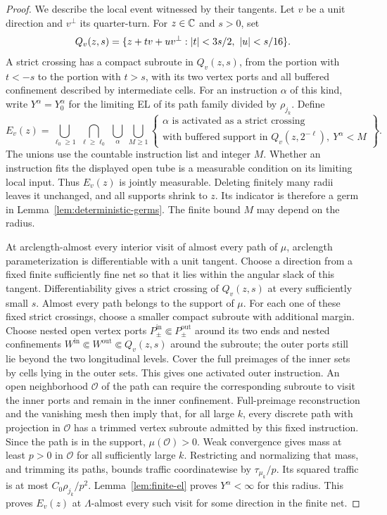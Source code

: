 \begin{proof}
We describe the local event witnessed by their tangents.  Let \(v\) be a
unit direction and \(v^\perp\) its quarter-turn.  For \(z\in\mathbb C\) and
\(s>0\), set
\[
 Q_v(z,s)=
 \{z+tv+uv^\perp:\lvert t\rvert<3s/2,\ \lvert u\rvert<s/16\}.
\]
A strict crossing has a compact subroute in \(Q_v(z,s)\), from the portion
with \(t<-s\) to the portion with \(t>s\), with its two vertex ports and
all buffered confinement described by intermediate cells.  For an
instruction \(\alpha\) of this kind, write \(Y^\alpha=Y_0^\alpha\) for
the limiting EL of its path family divided by \(\rho_{j_k}\).  Define
\begin{equation}\label{eq:crossing-germ}
 E_v(z)=
 \bigcup_{\ell_0\ge1}\ \bigcap_{\ell\ge\ell_0}\
 \bigcup_{\alpha}\ \bigcup_{M\ge1}
 \left\{
 \begin{array}{l}
 \alpha\text{ is activated as a strict crossing}\\[-2pt]
 \text{with buffered support in }Q_v(z,2^{-\ell}),\
 Y^\alpha<M
 \end{array}\right\}.
\end{equation}
The unions use the countable instruction list and integer \(M\).  Whether
an instruction fits the displayed open tube is a measurable condition
on its limiting local input.  Thus \(E_v(z)\) is jointly measurable.
Deleting finitely many radii leaves it unchanged, and all supports shrink
to \(z\).  Its indicator is therefore a germ in
Lemma~\ref{lem:deterministic-germs}.  The finite bound \(M\) may depend on
the radius.

At arclength-almost every interior visit of almost every path of \(\mu\),
arclength parameterization is differentiable with a unit tangent.  Choose
a direction from a fixed finite sufficiently fine net so that it lies
within the angular slack of this tangent.  Differentiability gives a
strict crossing of \(Q_v(z,s)\) at every sufficiently small \(s\).
Almost every path belongs to the support of \(\mu\).  For each one of
these fixed strict crossings, choose a smaller compact subroute with
additional margin.  Choose nested open vertex ports
\(P_\pm^{\mathrm{in}}\Subset P_\pm^{\mathrm{out}}\) around its two ends
and nested confinements
\(W^{\mathrm{in}}\Subset W^{\mathrm{out}}\Subset Q_v(z,s)\) around the
subroute; the outer ports still lie beyond the two longitudinal levels.
Cover the full preimages of the inner sets by cells lying in the outer
sets.  This gives one activated outer instruction.  An open neighborhood
\(\mathcal O\) of the path can require the corresponding subroute to
visit the inner ports and remain in the inner confinement.  Full-preimage
reconstruction and the vanishing mesh then imply that, for all large
\(k\), every discrete path with projection in \(\mathcal O\) has a trimmed
vertex subroute admitted by this fixed instruction.  Since the path is
in the support, \(\mu(\mathcal O)>0\).  Weak convergence gives mass at
least \(p>0\) in \(\mathcal O\) for all sufficiently large \(k\).
Restricting and normalizing that mass, and trimming its paths, bounds
traffic coordinatewise by
\(\tau_{\mu_k}/p\).  Its squared traffic is at most
\(C_0\rho_{j_k}/p^2\).  Lemma~\ref{lem:finite-el} proves \(Y^\alpha<\infty\)
for this radius.  This proves \(E_v(z)\) at \(\Lambda\)-almost every
such visit for some direction in the finite net.


\end{proof}
